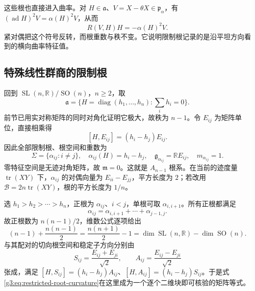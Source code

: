 \ProseParagraphBreak

这些根也直接进入曲率。对 \(H\in\mathfrak a\)、\(V=X-\theta X\in\mathfrak p_\alpha\)，有 \((\operatorname{ad}H)^2V=\alpha(H)^2V\)，从而
\begin{equation}\label{g3:eq:restricted-root-curvature}
	R(V,H)H=-\alpha(H)^2V.
\end{equation}
紧对偶把这个符号反转，而根重数与秩不变。它说明限制根记录的是沿平坦方向看到的横向曲率特征值。

\subsection{特殊线性群商的限制根}
\label{g3:subsec:0506:02}

回到 \(\operatorname{SL}(n,\mathbb R)/\operatorname{SO}(n)\)，\(n\ge2\)，取
\[
	\mathfrak a=\{H=\operatorname{diag}(h_1,\ldots,h_n):\textstyle\sum_i h_i=0\}.
\]
前节已用实对称矩阵的同时对角化证明它极大，故秩为 \(n-1\)。令 \(E_{ij}\) 为矩阵单位，直接相乘得
\[
	[H,E_{ij}]=(h_i-h_j)E_{ij}.
\]
因此全部限制根、根空间和重数为
\begin{equation}\label{g3:eq:sl-restricted-roots}
	\Sigma=\{\alpha_{ij}:i\ne j\},\quad
	\alpha_{ij}(H)=h_i-h_j,\quad
	\mathfrak g_{\alpha_{ij}}=\mathbb R E_{ij},\quad m_{\alpha_{ij}}=1.
\end{equation}
零特征空间是无迹对角矩阵，故 \(\mathfrak m=0\)。这就是 \(A_{n-1}\) 根系。在当前的迹度量 \(\operatorname{tr}(XY)\) 下，\(\alpha_{ij}\) 的对偶向量为 \(E_{ii}-E_{jj}\)，平方长度为 \(2\)；若改用 \(\mathcal B=2n\operatorname{tr}(XY)\)，根的平方长度为 \(1/n\)。

\ProseParagraphBreak

选 \(h_1>h_2>\cdots>h_n\)，正根为 \(\alpha_{ij}\)、\(i<j\)，单根可取 \(\alpha_{i,i+1}\)。所有正根都满足
\[
	\alpha_{ij}=\alpha_{i,i+1}+\cdots+\alpha_{j-1,j}.
\]
故正根数为 \(n(n-1)/2\)，维数公式逐项给出
\[
	(n-1)+\frac{n(n-1)}2=\frac{n(n+1)}2-1
	=\dim\operatorname{SL}(n,\mathbb R)-\dim\operatorname{SO}(n).
\]
与其配对的切向根空间和稳定子方向分别由
\[
	S_{ij}=\frac{E_{ij}+E_{ji}}{\sqrt2},\qquad
	A_{ij}=\frac{E_{ij}-E_{ji}}{\sqrt2}
\]
张成，满足 \([H,S_{ij}]=(h_i-h_j)A_{ij}\)、\([H,A_{ij}]=(h_i-h_j)S_{ij}\)。于是式\eqref{g3:eq:restricted-root-curvature}在这里成为一个逐个二维块即可核验的矩阵等式。


